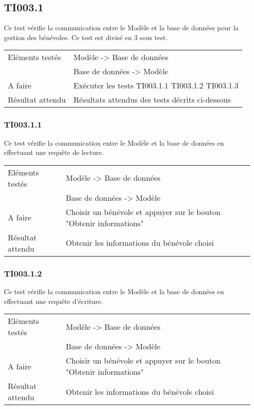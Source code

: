   	\subsection{TI003.1}
  		Ce test vérifie la communication entre le Modèle et la base de données pour la gestion des bénévoles. Ce test est divisé en 3 sous test.
  	
 
 	 \begin{center}
    	 	\begin{tabular}[h]{|p{}|p{}|}
		\hline
			Eléments testés & Modèle -> Base de données  \\
						    &  Base de données -> Modèle \\\hline
    			A faire & Exécuter les tests TI003.1.1 TI003.1.2 TI003.1.3 \\\hline
    			Résultat attendu & Résultats attendus des tests décrits ci-dessous \\\hline
     	\end{tabular}
  	\end{center}	
  	
  	\subsubsection{TI003.1.1}
  		Ce test vérifie la communication entre le Modèle et la base de données en effectuant une requête de lecture.
  		\begin{center}
    	 		\begin{tabular}[h]{|p{}|p{}|}
			\hline
				Eléments testés & Modèle -> Base de données  \\
							    &  Base de données -> Modèle \\\hline
    				A faire & Choisir un bénévole et appuyer sur le bouton "Obtenir informations" \\\hline
    				Résultat attendu & Obtenir les informations du bénévole choisi \\\hline
     		\end{tabular}
  		\end{center}	
  		
  		
  		
  		
  		
  	\subsubsection{TI003.1.2}
  		Ce test vérifie la communication entre le Modèle et la base de données en effectuant une requête d'écriture.
  		\begin{center}
    	 		\begin{tabular}[h]{|p{}|p{}|}
			\hline
				Eléments testés & Modèle -> Base de données  \\
							    &  Base de données -> Modèle \\\hline
    				A faire & Choisir un bénévole et appuyer sur le bouton "Obtenir informations" \\\hline
    				Résultat attendu & Obtenir les informations du bénévole choisi \\\hline
     		\end{tabular}
  		\end{center}	
  		